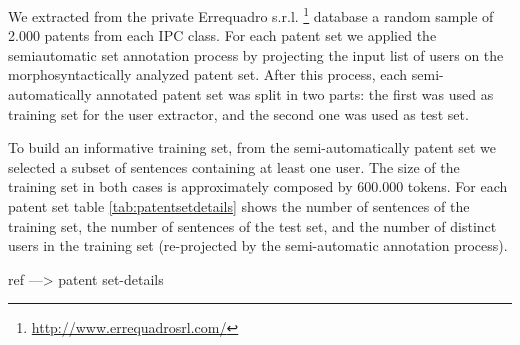 \documentclass[]{book}
\let\rmarkdownfootnote\footnote%
\def\footnote{\protect\rmarkdownfootnote}
\begin{document}
We extracted from the private Errequadro s.r.l. \footnote{\url{http://www.errequadrosrl.com/}}
database a random sample of 2.000 patents from each IPC class. For each
patent set we applied the semiautomatic set annotation process by
projecting the input list of users on the morphosyntactically analyzed
patent set. After this process, each semi-automatically annotated patent
set was split in two parts: the first was used as training set for the
user extractor, and the second one was used as test set.

To build an informative training set, from the semi-automatically patent
set we selected a subset of sentences containing at least one user. The
size of the training set in both cases is approximately composed by
600.000 tokens. For each patent set table \ref{tab:patentsetdetails}
shows the number of sentences of the training set, the number of
sentences of the test set, and the number of distinct users in the
training set (re-projected by the semi-automatic annotation process).

ref ---\textgreater{} patent set-details
\end{document}
